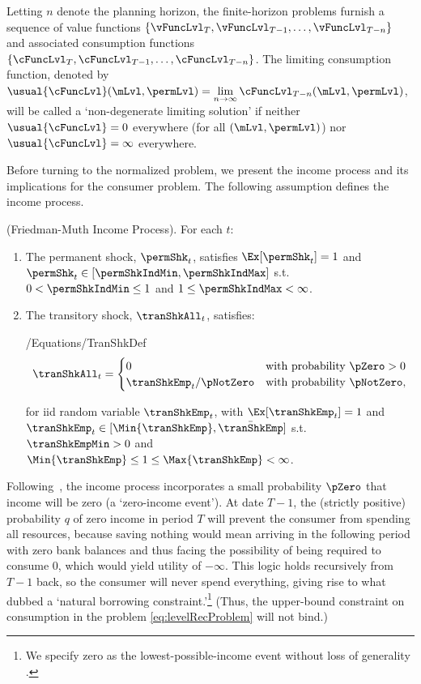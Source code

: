 \documentclass[BufferStockTheory]{subfiles}
\begin{document}
Letting $n$ denote the planning horizon, the finite-horizon problems furnish a sequence of value functions $\{\vFuncLvl_{T},\vFuncLvl_{T-1},\ldots,\vFuncLvl_{T-n}\}$ and associated consumption functions $\{\cFuncLvl_{T},\cFuncLvl_{T-1},\ldots,\cFuncLvl_{T-n}\}$.
The limiting consumption function, denoted by $\usual{\cFuncLvl}(\mLvl,\permLvl) = \lim\limits_{n \rightarrow \infty} \cFuncLvl_{T-n}(\mLvl,\permLvl)$, will be called a `non-degenerate limiting solution' if  neither $\usual{\cFuncLvl}=0$ everywhere (for all $(\mLvl,\permLvl)$) nor $\usual{\cFuncLvl}=\infty$ everywhere.

Before turning to the normalized problem, we present the income process and its implications for the consumer problem.
The following assumption defines the income process.

\begin{assumI}\label{ass:shocks}(Friedman-Muth Income Process).
For each $t$:
\begin{enumerate}
\item The permanent shock, $\permShk_{t}$, satisfies $\Ex[{\permShk}_{t}]=1$ and  $\permShk_{t}\in [\permShkIndMin,\permShkIndMax]$ s.t. $0 < \permShkIndMin \leq 1$ and $1 \leq \permShkIndMax < \infty$. 
\item The transitory shock, $\tranShkAll_{t}$, satisfies: 
\begin{verbatimwrite}{\econtexRoot/Equations/TranShkDef}
  \begin{equation}
    \tranShkAll_{t}=
    \begin{cases}
      0\phantom{_{t+1}/\pNotZero} & \text{with probability $\pZero > 0$} \\
      \tranShkEmp_{t}/\pNotZero      & \text{with probability $\pNotZero  $}, %
    \end{cases} \label{eq:TranShkDef}
  \end{equation}
\end{verbatimwrite}\unskip

\noindent for iid random variable $\tranShkEmp_{t}$,  with $\Ex[{\tranShkEmp}_{t}]=1$ and $ \tranShkEmp_{t} \in [\Min{\tranShkEmp}, \bar{\tranShkEmp}]$ s.t.
$\tranShkEmpMin >0$ and $\Min{\tranShkEmp} \leq 1 \leq \Max{\tranShkEmp} < \infty$.

\end{enumerate} 
\end{assumI}

Following~\cite{zeldesStochastic}, the income process incorporates a small probability $\pZero$ that income will be zero (a `zero-income event').
At date $T-1$, the (strictly positive) probability $q$ of zero income in period $T$ will prevent the consumer from spending all resources, because saving nothing would mean arriving in the following period with zero bank balances and thus facing the possibility of being required to consume 0, which would yield utility of $-\infty$.
This logic holds recursively from $T-1$ back, so  the consumer will never spend everything, giving rise to what \cite{aiyagari:ge} dubbed a `natural borrowing constraint.'\footnote{We specify zero as the lowest-possible-income event without loss of generality \citep{aiyagari:ge}.} (Thus, the upper-bound constraint on consumption in the problem \eqref{eq:levelRecProblem} will not bind.)
\end{document}
